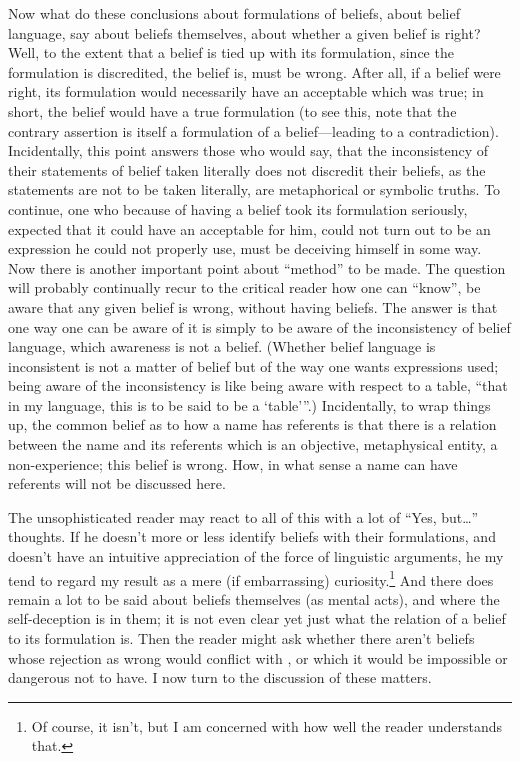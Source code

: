 Now what do these conclusions about formulations of beliefs, about 
belief language, say about beliefs themselves, about whether a given belief is 
right? Well, to the extent that a belief is tied up with its formulation, since 
the formulation is discredited, the belief is, must be wrong. After all, if a 
belief were right, its formulation would necessarily have an acceptable 
 which was true; in short, the belief would have a true 
formulation (to see this, note that the contrary assertion is itself a 
formulation of a belief---leading to a contradiction). Incidentally, this point 
answers those who would say, that the inconsistency of their statements of 
belief taken literally does not discredit their beliefs, as the statements are not 
to be taken literally, are metaphorical or symbolic truths. To continue, one 
who because of having a belief took its formulation seriously, expected that 
it could have an acceptable  for him, could not turn out to be an 
expression he could not properly use, must be deceiving himself in some 
way. Now there is another important point about \enquote{method} to be made. 
The question will probably continually recur to the critical reader how one 
can \enquote{know}, be aware that any given belief is wrong, without having beliefs. 
The answer is that one way one can be aware of it is simply to be aware of 
the inconsistency of belief language, which awareness is not a belief. 
(Whether belief language is inconsistent is not a matter of belief but of the 
way one wants expressions used; being aware of the inconsistency is like 
being aware with respect to a table, \enquote{that in my language, this is to be said to 
be a \enquote{table}}.) Incidentally, to wrap things up, the common belief as to how 
a name has referents is that there is a relation between the name and its 
referents which is an objective, metaphysical entity, a non-experience; this 
belief is wrong. How, in what sense a name can have referents will not be 
discussed here. 

The unsophisticated reader may react to all of this with a lot of \enquote{Yes, 
but\ldots} thoughts. If he doesn't more or less identify beliefs with their 
formulations, and doesn't have an intuitive appreciation of the force of 
linguistic arguments, he my tend to regard my result as a mere (if 
embarrassing) curiosity.\footnote{Of course, it isn't, but I am concerned with how 
well the reader understands that.} And there does remain a lot to be said 
about beliefs themselves (as mental acts), and where the self-deception is in 
them; it is not even clear yet just what the relation of a belief to its 
formulation is. Then the reader might ask whether there aren't beliefs whose 
rejection as wrong would conflict with , or which it would be 
impossible or dangerous not to have. I now turn to the discussion of these 
matters. 

